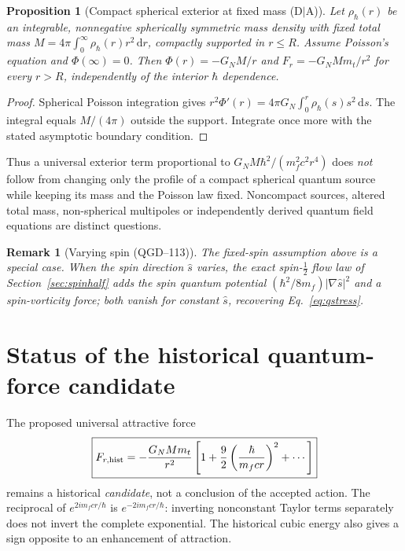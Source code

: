 \documentclass[11pt,a4paper]{article}
\newtheorem{proposition}[theorem]{Proposition}
\newtheorem{remark}[theorem]{Remark}
\newcommand{\dd}{\mathrm d}
\begin{document}
\begin{proposition}[Compact spherical exterior at fixed mass (D$\mid$A)]
\label{prop:exterior}
Let $\rho_\hbar(r)$ be an integrable, nonnegative spherically symmetric
mass density with fixed total mass
$M=4\pi\int_0^\infty\rho_\hbar(r)r^2\,\dd r$, compactly supported
in $r\leq R$. Assume Poisson's equation and $\Phi(\infty)=0$.
Then $\Phi(r)=-G_NM/r$ and
$F_r=-G_NMm_t/r^2$ for every $r>R$, independently of the interior
$\hbar$ dependence.
\end{proposition}
\begin{proof}
Spherical Poisson integration gives
$r^2\Phi'(r)=4\pi G_N\int_0^r\rho_\hbar(s)s^2\,\dd s$.
The integral equals $M/(4\pi)$ outside the support. Integrate once
more with the stated asymptotic boundary condition.
\end{proof}
Thus a universal exterior term proportional to
$G_NM\hbar^2/(m_f^2c^2r^4)$ does \emph{not} follow from changing only
the profile of a compact spherical quantum source while keeping its
mass and the Poisson law fixed. Noncompact sources, altered total mass,
non-spherical multipoles or independently derived quantum field
equations are distinct questions.
\begin{remark}[Varying spin (QGD--113)]
The fixed-spin assumption above is a special case. When the spin direction
$\hat s$ varies, the exact spin-$\frac12$ flow law of Section~\ref{sec:spinhalf} adds the
spin quantum potential $(\hbar^2/8m_f)|\nabla\hat s|^2$ and a spin-vorticity force; both
vanish for constant $\hat s$, recovering Eq.~\eqref{eq:qstress}.
\end{remark}

\section{Status of the historical quantum-force candidate}\label{sec:historicalforce}
The proposed universal attractive force
\begin{equation}\label{eq:historic9}
\boxed{\displaystyle F_{r,\rm hist}=-\frac{G_NMm_t}{r^2}
\left[1+\frac92\left(\frac{\hbar}{m_fc r}\right)^2+\cdots\right]}
\end{equation}
remains a historical \emph{candidate}, not a conclusion of the
accepted action. The reciprocal of $e^{2im_fcr/\hbar}$ is
$e^{-2im_fcr/\hbar}$: inverting nonconstant Taylor terms separately
does not invert the complete exponential. The historical cubic energy
also gives a sign opposite to an enhancement of attraction.
\end{document}
